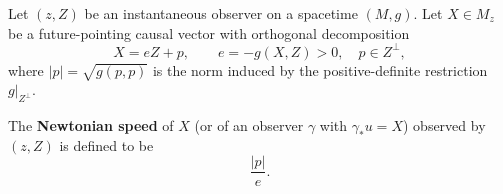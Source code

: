 Let $(z, Z)$ be an instantaneous observer on a spacetime $(M, g)$. Let $X \in M_z$ be a future-pointing causal vector with orthogonal decomposition
$$X = eZ + p, \qquad e = -g(X, Z) > 0, \quad p \in Z^\perp,$$
where $|p| = \sqrt{g(p, p)}$ is the norm induced by the positive-definite restriction $g|_{Z^\perp}$.

The \textbf{Newtonian speed} of $X$ (or of an observer $\gamma$ with $\gamma_* u = X$) observed by $(z, Z)$ is defined to be
$$\frac{|p|}{e}.$$
